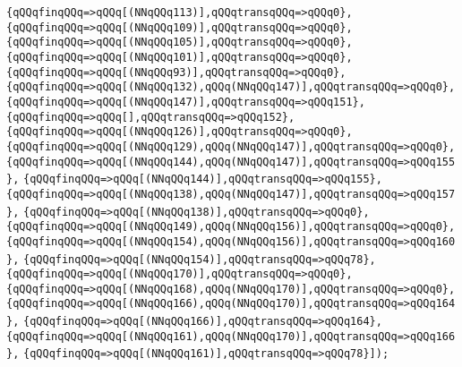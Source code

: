 \verb|{qQQqfinqQQq=>qQQq[(NNqQQq113)],qQQqtransqQQq=>qQQq0},|\newline
\verb|{qQQqfinqQQq=>qQQq[(NNqQQq109)],qQQqtransqQQq=>qQQq0},|\newline
\verb|{qQQqfinqQQq=>qQQq[(NNqQQq105)],qQQqtransqQQq=>qQQq0},|\newline
\verb|{qQQqfinqQQq=>qQQq[(NNqQQq101)],qQQqtransqQQq=>qQQq0},|\newline
\verb|{qQQqfinqQQq=>qQQq[(NNqQQq93)],qQQqtransqQQq=>qQQq0},|\newline
\verb|{qQQqfinqQQq=>qQQq[(NNqQQq132),qQQq(NNqQQq147)],qQQqtransqQQq=>qQQq0},|\newline
\verb|{qQQqfinqQQq=>qQQq[(NNqQQq147)],qQQqtransqQQq=>qQQq151},|\newline
\verb|{qQQqfinqQQq=>qQQq[],qQQqtransqQQq=>qQQq152},|\newline
\verb|{qQQqfinqQQq=>qQQq[(NNqQQq126)],qQQqtransqQQq=>qQQq0},|\newline
\verb|{qQQqfinqQQq=>qQQq[(NNqQQq129),qQQq(NNqQQq147)],qQQqtransqQQq=>qQQq0},|\newline
\verb|{qQQqfinqQQq=>qQQq[(NNqQQq144),qQQq(NNqQQq147)],qQQqtransqQQq=>qQQq155},|\newline
\verb|{qQQqfinqQQq=>qQQq[(NNqQQq144)],qQQqtransqQQq=>qQQq155},|\newline
\verb|{qQQqfinqQQq=>qQQq[(NNqQQq138),qQQq(NNqQQq147)],qQQqtransqQQq=>qQQq157},|\newline
\verb|{qQQqfinqQQq=>qQQq[(NNqQQq138)],qQQqtransqQQq=>qQQq0},|\newline
\verb|{qQQqfinqQQq=>qQQq[(NNqQQq149),qQQq(NNqQQq156)],qQQqtransqQQq=>qQQq0},|\newline
\verb|{qQQqfinqQQq=>qQQq[(NNqQQq154),qQQq(NNqQQq156)],qQQqtransqQQq=>qQQq160},|\newline
\verb|{qQQqfinqQQq=>qQQq[(NNqQQq154)],qQQqtransqQQq=>qQQq78},|\newline
\verb|{qQQqfinqQQq=>qQQq[(NNqQQq170)],qQQqtransqQQq=>qQQq0},|\newline
\verb|{qQQqfinqQQq=>qQQq[(NNqQQq168),qQQq(NNqQQq170)],qQQqtransqQQq=>qQQq0},|\newline
\verb|{qQQqfinqQQq=>qQQq[(NNqQQq166),qQQq(NNqQQq170)],qQQqtransqQQq=>qQQq164},|\newline
\verb|{qQQqfinqQQq=>qQQq[(NNqQQq166)],qQQqtransqQQq=>qQQq164},|\newline
\verb|{qQQqfinqQQq=>qQQq[(NNqQQq161),qQQq(NNqQQq170)],qQQqtransqQQq=>qQQq166},|\newline
\verb|{qQQqfinqQQq=>qQQq[(NNqQQq161)],qQQqtransqQQq=>qQQq78}]);|\newline
